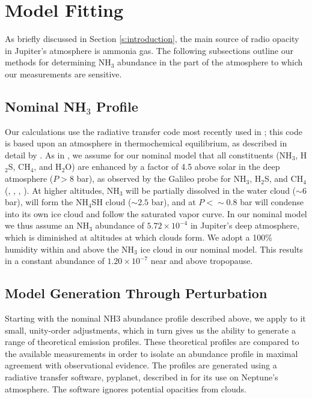 \documentclass{article}
\newcommand{\e}[1]{\times 10^{#1}}
\begin{document}
\section{Model Fitting} \label{s:model}

	As briefly discussed in Section \ref{s:introduction}, the main source of radio opacity in Jupiter's atmosphere is ammonia gas.
	The following subsections outline our methods for determining NH$_{3}$ abundance in the part of the atmosphere to which our measurements are sensitive.

\subsection{Nominal NH$_{3}$ Profile}

	Our calculations use the radiative transfer code most recently used in \citealt{2016Sci...352.1198D}; this code is based upon an atmosphere in thermochemical equilibrium, as described in detail by \citealt{2005Icar..173..425D}.
	As in \citealt{2016Sci...352.1198D}, we assume for our nominal model that all constituents (NH$_{3}$, H$_{2}$S, CH$_{4}$, and H$_{2}$O) are enhanced by a factor of 4.5 above solar in the deep atmosphere ($P > 8$ bar), as observed by the Galileo probe for NH$_{3}$, H$_{2}$S, and CH$_{4}$ (\citealt{1998JGR...10322847F}, \citealt{1999BAAS...31.1154M}, \citealt{1998JGR...10322929S}, \citealt{2004Icar..171..153W}).
	At higher altitudes, NH$_{3}$ will be partially dissolved in the water cloud ($\sim 6$ bar), will form the NH$_{4}$SH cloud ($\sim 2.5$ bar), and at $P < \sim 0.8$ bar will condense into its own ice cloud and follow the saturated vapor curve.
	In our nominal model we thus assume an NH$_{3}$ abundance of $5.72 \e{-4}$ in Jupiter's deep atmosphere, which is diminished at altitudes at which clouds form.
	We adopt a 100\% humidity within and above the NH$_{3}$ ice cloud in our nominal model.
	This results in a constant abundance of $1.20\e{-7}$ near and above tropopause.

\subsection{Model Generation Through Perturbation}

	Starting with the nominal NH3 abundance profile described above, we apply to it small, unity-order adjustments, which in turn gives us the ability to generate a range of theoretical emission profiles.
	These theoretical profiles are compared to the available measurements in order to isolate an abundance profile in maximal agreement with observational evidence.
	The profiles are generated using a radiative transfer software, pyplanet, described in \citealt{2014Icar..237..211D} for its use on Neptune's atmosphere. The software ignores potential opacities from clouds.
\end{document}
